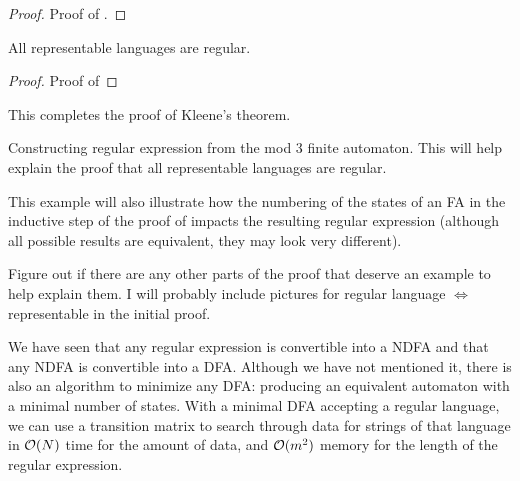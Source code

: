 \documentclass{bcthesis}
\renewcommand{\meo}{}
\begin{document}
	\begin{proof}
	\label{proof:ndfa_dfa_equivalent}
		Proof of .
	\end{proof}

	\begin{claim}
	\label{prop:representable_languages_regular}
		All representable languages are regular.
	\end{claim}

	\begin{proof}
		Proof of 
	\end{proof}
	

	This completes the proof of Kleene's theorem.



\label{sec:examples}

	\begin{example}
		Constructing regular expression from the mod 3 finite automaton.
		This will help explain the proof that all representable languages are regular.

		This example will also illustrate how the numbering of the states of an FA in the inductive step of the proof of  impacts the resulting regular expression (although all possible results are equivalent, they may look very different).
	\end{example}

	\meo{
		Figure out if there are any other parts of the proof that deserve an example to help explain them.
		I will probably include pictures for regular language $\iff$ representable in the initial proof.
	}


\label{sec:motivation}
	\begin{remark}
		We have seen that any regular expression is convertible into a NDFA and that any NDFA is convertible into a DFA.
		Although we have not mentioned it, there is also an algorithm to minimize any DFA: producing an equivalent automaton with a minimal number of states. 
		With a minimal DFA accepting a regular language, we can use a transition matrix to search through data for strings of that language in $\mathcal{O}(N)$ time for the amount of data, and $\mathcal{O}(m^2)$ memory for the length of the regular expression.
	\end{remark}
\end{document}

